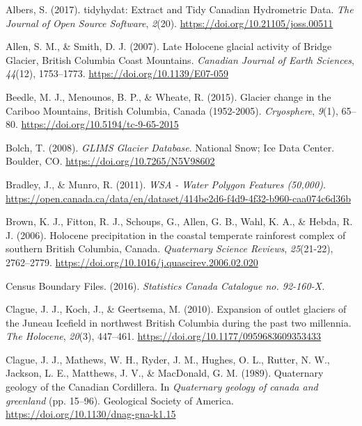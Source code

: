 \documentclass[
  letterpaper,
  DIV=11,
  numbers=noendperiod]{scrartcl}
\newlength{\cslhangindent}
\newenvironment{CSLReferences}[2] %
 {\begin{list}{}{%
  \setlength{\itemindent}{0pt}
  \setlength{\leftmargin}{0pt}
  \setlength{\parsep}{0pt}
  \ifodd #1
   \setlength{\leftmargin}{\cslhangindent}
   \setlength{\itemindent}{-1\cslhangindent}
  \fi
  \setlength{\itemsep}{#2\baselineskip}}}
 {\end{list}}
\begin{document}
\label{refs}
\begin{CSLReferences}{1}{0}
Albers, S. (2017). {tidyhydat: Extract and Tidy Canadian Hydrometric
Data}. \emph{The Journal of Open Source Software}, \emph{2}(20).
\url{https://doi.org/10.21105/joss.00511}

Allen, S. M., \& Smith, D. J. (2007). {Late Holocene glacial activity of
Bridge Glacier, British Columbia Coast Mountains}. \emph{Canadian
Journal of Earth Sciences}, \emph{44}(12), 1753--1773.
\url{https://doi.org/10.1139/E07-059}

Beedle, M. J., Menounos, B. P., \& Wheate, R. (2015). {Glacier change in
the Cariboo Mountains, British Columbia, Canada (1952-2005)}.
\emph{Cryosphere}, \emph{9}(1), 65--80.
\url{https://doi.org/10.5194/tc-9-65-2015}

Bolch, T. (2008). \emph{{GLIMS Glacier Database}}. National Snow; Ice
Data Center. Boulder, CO. \url{https://doi.org/10.7265/N5V98602}

Bradley, J., \& Munro, R. (2011). \emph{{WSA - Water Polygon Features
(50,000)}}.
\url{https://open.canada.ca/data/en/dataset/414be2d6-f4d9-4f32-b960-caa074c6d36b}

Brown, K. J., Fitton, R. J., Schoups, G., Allen, G. B., Wahl, K. A., \&
Hebda, R. J. (2006). {Holocene precipitation in the coastal temperate
rainforest complex of southern British Columbia, Canada}.
\emph{Quaternary Science Reviews}, \emph{25}(21-22), 2762--2779.
\url{https://doi.org/10.1016/j.quascirev.2006.02.020}

Census Boundary Files. (2016). \emph{{Statistics Canada Catalogue no.
92-160-X.}}

Clague, J. J., Koch, J., \& Geertsema, M. (2010). {Expansion of outlet
glaciers of the Juneau Icefield in northwest British Columbia during the
past two millennia}. \emph{The Holocene}, \emph{20}(3), 447--461.
\url{https://doi.org/10.1177/0959683609353433}

Clague, J. J., Mathews, W. H., Ryder, J. M., Hughes, O. L., Rutter, N.
W., Jackson, L. E., Matthews, J. V., \& MacDonald, G. M. (1989).
{Quaternary geology of the Canadian Cordillera}. In \emph{Quaternary
geology of canada and greenland} (pp. 15--96). Geological Society of
America. \url{https://doi.org/10.1130/dnag-gna-k1.15}


\end{CSLReferences}
\end{document}
